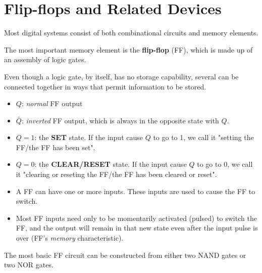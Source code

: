 \chapter{Flip-flops and Related Devices}

  \par Most digital systems consist of both combinational circuits and
  memory elements.
  \par The most important memory element is the \textbf{flip-flop} (FF),
  which is made up of an assembly of logic gates.
  \par Even though a logic gate, by itself, has no storage capability,
  several can be connected together in ways that permit information
  to be stored.
  \begin{itemize}
    \item $Q$: \textit{normal} FF output
    \item $\bar{Q}$: \textit{inverted} FF output, which is always in the
    opposite state with $Q$.
    \item $Q = 1$: the \textbf{SET} state. If the input cause $Q$ to go to 1,
    we call it "setting the FF/the FF has been set".
    \item $Q = 0$: the \textbf{CLEAR/RESET} state. If the input cause $Q$ to
    go to 0, we call it "clearing or reseting the FF/the FF has been cleared
    or reset".
    \item A FF can have one or more inputs. These inputs are used to cause the
    FF to switch.
    \item Most FF inputs need only to be momentarily activated (pulsed) to switch
    the FF, and the output will remain in that new state even after the input
    pulse is over (FF's \textit{memory} characteristic).
  \end{itemize}
  \par The most basic FF circuit can be constructed from either two NAND gates or
  two NOR gates.

